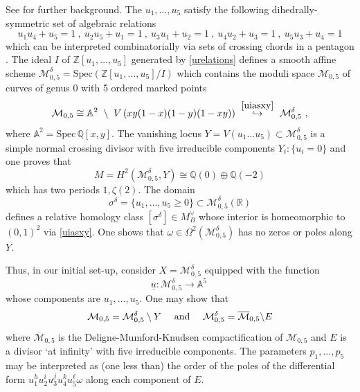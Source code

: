 \documentclass[a4paper,10pt]{amsart}
\theoremstyle{definition}
\theoremstyle{remark}
\numberwithin{equation}{section}
\newcommand{\To}{\longrightarrow}
\newcommand{\Z}{\mathbb Z}
\newcommand{\Q}{\mathbb Q}
\newcommand{\R}{\mathbb R}
\newcommand{\0}{\color{blue}{\mathsf{0}}}
\begin{document}
See \cite{BrENS, DinnerParties} for further background.     
    The $u_1,\ldots, u_5$ satisfy the following dihedrally-symmetric  set of algebraic relations 
    \begin{equation} \label{urelations}   u_1 u_4 + u_5 =1 \ ,  \  u_2 u_5 + u_1 =1   \ ,  \ u_3 u_1 + u_2 =1    \ , \ 
        u_4 u_2 + u_3 =1 \ ,   \ u_5 u_3 + u_4 =1       \end{equation}  
    which can be interpreted combinatorially via sets of crossing chords in a pentagon \cite{BrENS}.  The ideal $I$ of $\Z[u_1,\ldots, u_5]$ generated by \eqref{urelations}  defines a smooth affine scheme 
    $\mathcal{M}_{0,5}^{\delta} = \mathrm{Spec} \left( \Z[u_1,\ldots, u_5]/I\right) $ which contains  the moduli space $\mathcal{M}_{0,5}$ of curves of genus $0$ with 5 ordered marked points 
    \[\mathcal{M}_{0,5}  \cong  \mathbb{A}^2  \ \setminus  \  V\left(xy(1-x)(1-y)(1-xy)\right) \   \overset{\eqref{uiasxy}}{\hookrightarrow}  \ \mathcal{M}_{0,5}^{\delta} \ ,   \] 
    where $\mathbb{A}^2 = \mathrm{Spec} \, \Q[x,y]$.   
     The vanishing locus  
   $Y= V(u_1\ldots u_5) \subset \mathcal{M}_{0,5}^{\delta}$
     is a simple normal crossing divisor with five irreducible components $Y_i: \{u_i=0\}$ and one proves that 
    \[ M= H^2 (\mathcal{M}^{\delta}_{0,5}, Y)  \cong  \Q(0) \oplus \Q(-2)\]
    which has two periods $1, \zeta(2)$. The domain 
    \[ \sigma^{\delta} = \{ u_1,\ldots, u_5 \geq 0 \} \subset \mathcal{M}_{0,5}^{\delta} (\R)\]
    defines a relative homology class $[\sigma^{\delta} ] \in M_B^{\vee}$ whose interior is homeomorphic to $(0,1)^2$ via \eqref{uiasxy}. One shows that  $\omega \in \Omega^2(\mathcal{M}^{\delta}_{0,5})$ has no zeros or poles along $Y$.
    
    Thus, in our initial set-up, consider  $X=\mathcal{M}_{0,5}^{\delta}$ equipped with the function
    \[ \underline{u} :  \mathcal{M}_{0,5}^{\delta}\To \mathbb{A}^5\ \]
whose components are $u_1,\ldots, u_5$.        One may show that
    \begin{equation}  \label{geomM05atinfinity}
     \mathcal{M}_{0,5} = \mathcal{M}_{0,5}^{\delta} \setminus Y \quad \hbox{ and }    \quad  \mathcal{M}_{0,5}^{\delta} = \overline{\mathcal{M}}_{0,5} \backslash E  \end{equation}
    where $\overline{\mathcal{M}}_{0,5}$ is the Deligne-Mumford-Knudsen compactification of $\mathcal{M}_{0,5}$ and $E$ is a divisor  `at infinity' with five irreducible components. 
     The parameters $p_1,\ldots, p_5$ may be interpreted as (one less than) the order of the poles of the differential form $u_1^{h}u_2^i u_3^j u_4^k u_5^{\ell} \omega$ along each component of $E$. 
    
\end{document}
